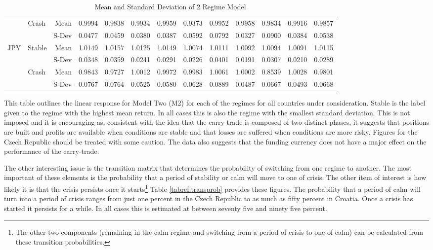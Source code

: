 \documentclass[12pt, a4paper, oneside]{article}\usepackage[]{graphicx}\usepackage[]{color}
\begin{document}
\begin{sidewaystable}[p]
\begin{threeparttable}
\begin{tabular}{llrrrrrrrrrrr}
   & \multirow{2}{*}{Crash}& Mean & 0.9994 & 0.9838 & 0.9934 & 0.9959 & 0.9373 & 0.9952 & 0.9958 & 0.9834 & 0.9916 & 0.9857 \\ 
  & & S-Dev & 0.0477 & 0.0459 & 0.0380 & 0.0387 & 0.0592 & 0.0792 & 0.0327 & 0.0900 & 0.0384 & 0.0538 \\ 
\hline  
  \multirow{4}{*}{JPY}&\multirow{2}{*}{Stable}& Mean& 1.0149 & 1.0157 & 1.0125 & 1.0149 & 1.0074 & 1.0111 & 1.0092 & 1.0094 & 1.0091 & 1.0115 \\ 
 & & S-Dev &0.0348 & 0.0359 & 0.0241 & 0.0291 & 0.0226 & 0.0401 & 0.0191 & 0.0307 & 0.0210 & 0.0289 \\ 
  & \multirow{2}{*}{Crash}&Mean & 0.9843 & 0.9727 & 1.0012 & 0.9972 & 0.9983 & 1.0061 & 1.0002 & 0.8539 & 1.0028 & 0.9801 \\ 
  & & S-Dev& 0.0767 & 0.0764 & 0.0525 & 0.0580 & 0.0628 & 0.0889 & 0.0487 & 0.0667 & 0.0493 & 0.0668 \\ 
   \hline
\end{tabular}
\begin{tablenotes}
\small
\item
This table outlines the linear response for Model Two (M2) for each of the regimes for all countries under consideration.  Stable is the label given to the regime with the highest mean return.  In all cases this is also the regime with the smallest standard deviation. This is not imposed and it is encouraging as, consistent with the idea that the carry-trade is composed of two distinct phases, it suggests that positions are built and profits are available when conditions are stable and that losses are suffered when conditions are more risky.  Figures for the Czech Republic should be treated with some caution.  The data also suggests that the funding currency does not have a major effect on the performance of the carry-trade.   
\end{tablenotes}
\caption{Mean and Standard Deviation of 2 Regime Model}
\label{tabref:2stateresponse}
\end{threeparttable}
  \end{sidewaystable}

The other interesting issue is the transition matrix that determines the probability of switching from one regime to another. The most important of these elements is the probability that a period of stability or calm will move to one of crisis.  The other item of interest is how likely it is that the crisis persists once it starts\footnote{The other two components (remaining in the calm regime and switching from a period of crisis to one of calm) can be calculated from these transition probabilities.}  Table \ref{tabref:transprob} provides these figures.  The probability that a period of calm will turn into a period of crisis ranges from just one percent in the Czech Republic to as much as fifty percent in Croatia. Once a crisis has started it persists for a while. In all cases this is estimated at between seventy five and ninety five percent.
\end{document}
